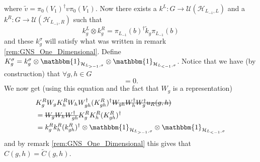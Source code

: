 \documentclass[12pt,a4paper,twoside]{article}
\newcommand{\stkout}[1]{\ifmmode\text{\sout{\ensuremath{#1}}}\else\sout{#1}\fi}
\newcommand{\UU}{\mathcal U}
\newcommand{\HH}{\mathcal H}
\newcommand{\ZZ}{\mathbb Z}
\newcommand{\id}{\mathbbm{1}}
\theoremstyle{definition}
\numberwithin{equation}{section}
\begin{document}
where $\tilde{v}=\pi_0(V_1)^\dagger v\pi_0(V_1)$. Now there exists a $k^L:G\rightarrow \UU(\HH_{L_{-1},L})$ and a $k^R:G\rightarrow \UU(\HH_{L_{-1},R})$ such that
\begin{equation}
	k^L_g\otimes k^R_g=\pi_{L_{-1}}(b)^\dagger \tilde k_g \pi_{L_{-1}}(b)
\end{equation}
and these $k^\sigma_g$ will satisfy what was written in remark \ref{rem:GNS_One_Dimensional}. Define $K^\sigma_g=k^\sigma_g\otimes\id_{\HH_{L_{>-1},\sigma}}\otimes\id_{\HH_{L_{<-1},\sigma}}$. Notice that we have (by construction) that $\forall g,h\in G$
\begin{equation}
	[K^\sigma_g\otimes\id_{\HH_{\ZZ^2/\sigma}},W_h]=0.
\end{equation}
We now get (using this equation and the fact that $W_g$ is a representation)
\begin{align}
	&K_g^R W_g K_h^R W_h W_{gh}^\dagger (K_{gh}^R)^\dagger \stkout{W_{gh}W_h^\dagger W_g^\dagger u_R(g,h)}\\
	&=\stkout{W_g W_h W_{gh}^\dagger} K_g^R K_h^R (K_{gh}^R)^\dagger\\
	&=k_g^R k_h^R (k_{gh}^R)^\dagger\otimes \id_{\HH_{L_{>-1},\sigma}}\otimes\id_{\HH_{L_{<-1},\sigma}}
\end{align}
and by remark \ref{rem:GNS_One_Dimensional} this gives that $C(g,h)=\tilde{C}(g,h)$.
\end{document}
